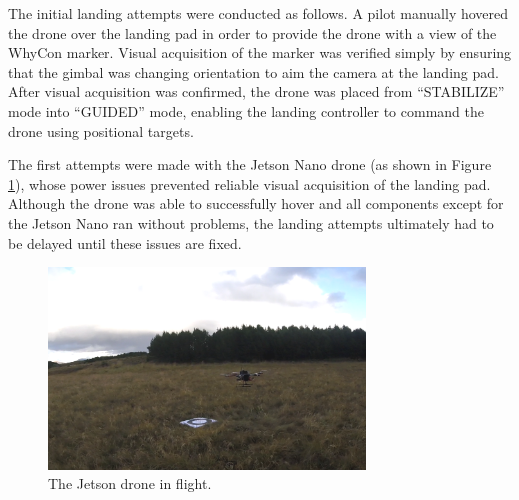 The initial landing attempts were conducted as follows. A pilot manually hovered the drone over the landing pad in order to provide the drone with a view of the WhyCon marker. Visual acquisition of the marker was verified simply by ensuring that the gimbal was changing orientation to aim the camera at the landing pad. After visual acquisition was confirmed, the drone was placed from ``STABILIZE'' mode into ``GUIDED'' mode, enabling the landing controller to command the drone using positional targets.

The first attempts were made with the Jetson Nano drone (as shown in Figure \ref{fig:jetson_in_flight}), whose power issues prevented reliable visual acquisition of the landing pad. Although the drone was able to successfully hover and all components except for the Jetson Nano ran without problems, the landing attempts ultimately had to be delayed until these issues are fixed.

\begin{figure}
    \centering
    \includegraphics[width=0.75\textwidth]{images/drone_in_flight.png}
    \caption{The Jetson drone in flight.}
    \label{fig:jetson_in_flight}
\end{figure}

